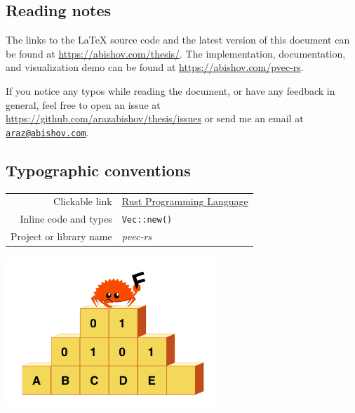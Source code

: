 \vspace*{2cm}
\thispagestyle{plain}

\begin{center}

    \section*{Reading notes}
    \begin{justify}
        The links to the LaTeX source code and the latest version of this document can be found at \url{https://abishov.com/thesis/}. The implementation, documentation, and visualization demo can be found at \url{https://abishov.com/pvec-rs}.

        If you notice any typos while reading the document, or have any feedback in general, feel free to open an issue at \url{https://github.com/arazabishov/thesis/issues} or send me an email at \href{mailto:araz@abishov.com}{\nolinkurl{araz@abishov.com}}.
    \end{justify}

    \subsection*{Typographic conventions}
    \begin{tabular}{ r l }
        Clickable link & \href{https://www.rust-lang.org/}{Rust Programming Language} \\
        Inline code and types & \texttt{Vec::new()} \\
        Project or library name & \emph{pvec-rs} \\
    \end{tabular}

    \vspace*{1cm}
    \includegraphics[width=8cm, angle=0, trim=10 10 10 10, clip]{images/ferris-climbing.png}
\end{center}

